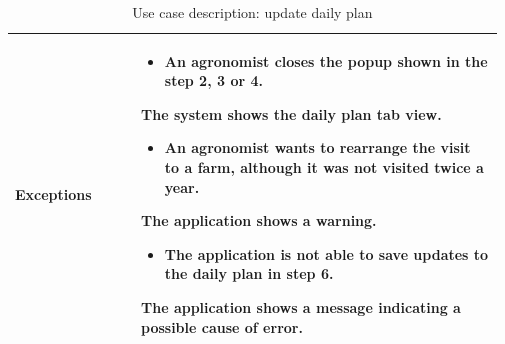 \begin{table}[H]
\begin{tabular}{@{}p{0.25\linewidth} p{0.72\linewidth}@{}}
		\textbf{Exceptions}         & \begin{itemize}[leftmargin=.4cm,noitemsep,topsep=0pt,before=\vspace{-3mm}]
		   \item An agronomist closes the popup shown in the step 2, 3 or 4.
		\end{itemize}
	    The system shows the daily plan tab view. \begin{itemize}[leftmargin=.4cm,noitemsep,topsep=0pt]
		   \item An agronomist wants to rearrange the visit to a farm, although it was not visited twice a year.
		\end{itemize}
		The application shows a warning.
	    \begin{itemize}[leftmargin=.4cm,noitemsep,topsep=0pt]
		   \item The application is not able to save updates to the daily plan in step 6. 
		\end{itemize}
		The application shows a message indicating a possible cause of error.
		\\\bottomrule
	\end{tabular}
	\caption{Use case description: update daily plan} 
\end{table}



